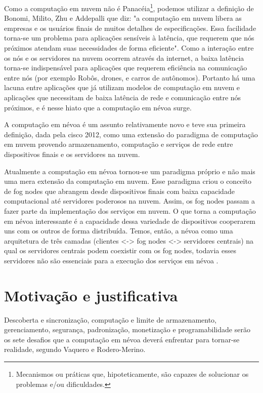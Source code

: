 Como a computação em nuvem não é Panacéia\footnote{Mecanismos ou práticas que, hipoteticamente, são capazes de solucionar os problemas e/ou dificuldades.}, podemos utilizar a definição de  Bonomi, Milito, Zhu e Addepalli\cite{Bonomi:2012} que diz: "a computação em nuvem libera as empresas e os usuários finais de muitos detalhes de especificações. Essa facilidade torna-se um problema para aplicações sensíveis à latência, que requerem que nós próximos atendam suas necessidades de forma eficiente". 
Como a interação entre os nós e os servidores na nuvem ocorrem através da internet, a baixa latência torna-se indispensável para aplicações que requerem eficiência na comunicação entre nós (por exemplo Robôs, drones, e carros de autônomos).
Portanto há uma lacuna entre aplicações que já utilizam modelos de computação em nuvem e aplicações que necessitam de baixa latência de rede e comunicação entre nós próximos, e é nesse hiato que a computação em névoa surge.

A computação em névoa é um assunto relativamente novo e teve sua primeira definição, dada pela cisco 2012, como uma extensão do paradigma de computação em nuvem provendo armazenamento, computação e serviços de rede entre dispositivos finais e os servidores na nuvem\cite{DBLP:journals/corr/RomanLM16}.

Atualmente a computação em névoa tornou-se um paradigma próprio e não mais uma mera extensão da computação em nuvem.
Esse paradigma criou o conceito de fog nodes que abrangem desde dispositivos finais com baixa capacidade computacional até servidores poderosos na nuvem. Assim, os fog nodes passam a fazer parte da implementação dos serviços em nuvem.
O que torna a computação em névoa interessante é a capacidade dessa variedade de dispositivos cooperarem uns com os outros de forma distribuída.
Temos, então, a névoa como uma arquitetura de três camadas (clientes <-> fog nodes <-> servidores centrais) na qual os servidores centrais podem coexistir com os fog nodes, todavia esses servidores não são essenciais para a execução dos serviços em névoa \cite{DBLP:journals/corr/RomanLM16}.

\section{Motivação e justificativa}

Descoberta e sincronização, computação e limite de armazenamento, gerenciamento, segurança, padronização, monetização e programabilidade serão os sete desafios que a computação em névoa deverá enfrentar para tornar-se realidade, segundo Vaquero e Rodero-Merino\cite{Vaquero:2014}.


